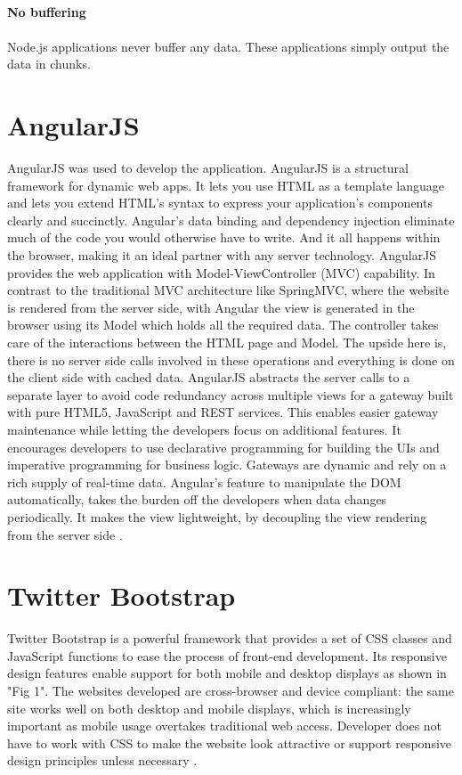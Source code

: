 \paragraph{No buffering}
\paragraph{}
Node.js applications never buffer any data. These applications simply output the data in chunks.


\section{AngularJS}
AngularJS was used to develop the application. AngularJS is a structural framework for dynamic web apps. It lets you use HTML as a template language and lets you extend HTML's syntax to express your application's components clearly and succinctly. Angular's data binding and dependency injection eliminate much of the code you would otherwise have to write. And it all happens within the browser, making it an ideal partner with any server technology.
AngularJS provides the web application with Model-ViewController
(MVC) capability. In contrast to the traditional
MVC architecture like SpringMVC, where the website is
rendered from the server side, with Angular the view is
generated in the browser using its Model which holds all the
required data. The controller takes care of the interactions
between the HTML page and Model. The upside here is, there
is no server side calls involved in these operations and
everything is done on the client side with cached data.
AngularJS abstracts the server calls to a separate layer to avoid code redundancy across multiple views for a gateway built
with pure HTML5, JavaScript and REST services. This enables
easier gateway maintenance while letting the developers focus
on additional features. It encourages developers to use
declarative programming for building the UIs and imperative
programming for business logic. Gateways are dynamic and rely on a rich supply of real-time data. Angular's feature to
manipulate the DOM automatically, takes the burden off the
developers when data changes periodically. It makes the view
lightweight, by decoupling the view rendering from the server
side \cite{AngularJS}. 


\section{Twitter Bootstrap}
Twitter Bootstrap is a powerful framework that provides a
set of CSS classes and JavaScript functions to ease the process
of front-end development. Its responsive design features enable
support for both mobile and desktop displays as shown in "Fig
1". The websites developed are cross-browser and device
compliant: the same site works well on both desktop and
mobile displays, which is increasingly important as mobile
usage overtakes traditional web access. Developer does not
have to work with CSS to make the website look attractive or
support responsive design principles unless necessary \cite{AngularJS}. 



